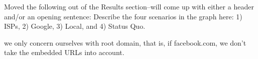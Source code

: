 

Moved the following out of the Results section--will come up with either a header and/or an 
opening sentence:
Describe the four scenarios in the graph here: 1) ISPs, 2) Google, 3) Local, and 
4) Status Quo.

we only concern ourselves with root domain, that is, if facebook.com, we don't 
take the embedded URLs into account.


